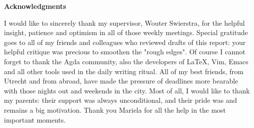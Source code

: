 \clearpage



{\centering \textbf{Acknowledgments}\\[5mm]}

I would like to sincerely thank my supervisor, Wouter Swierstra, for
the helpful insight, patience and optimism in all of those weekly meetings.
Special gratitude goes to all of my friends and colleagues who
reviewed drafts of this report: your helpful critique was precious to smoothen the "rough edges".
Of course I cannot forget to thank the Agda community, also
the developers of LaTeX, Vim, Emacs and all other tools used in the daily writing ritual.
All of my best friends, from Utrecht and from abroad, have made the
pressure of deadlines more bearable with those nights out and weekends in the city.
Most of all, I would like to thank my parents: their support was always unconditional,
and their pride was and remains a big motivation.
Thank you Mariela for all the help in the most important moments.

